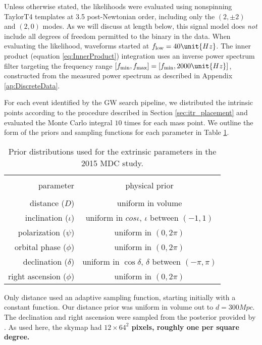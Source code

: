 %
Unless otherwise stated, the likelihoods were evaluated using nonspinning TaylorT4 templates at 3.5 post-Newtonian
order, including only the $(2,\pm 2)$ and $(2,0)$ modes.    As we will discuss at length below, this signal model does \emph{not} include all degrees of
freedom permitted to the binary in the data.  
When evaluating the likelihood,   waveforms started at $f_{\rm low}=40\unit{Hz}$.  The inner product (equation \ref{eq:InnerProduct}) integration uses an inverse power spectrum filter targeting the frequency range $[f_{\rm min},f_{\rm max}]=[f_{\rm min}, 2000\unit{Hz}]$, constructed from the measured power spectrum as described in Appendix \ref{ap:DiscreteData}.  

For each event identified by the GW search pipeline, we distributed the intrinsic points according to the procedure described in Section \ref{sec:itr_placement} and evaluated the Monte Carlo integral $10$ times for each mass point. We outline the form of the priors and sampling functions for each parameter in Table \ref{tbl:priors}.

\begin{table}
\begin{tabular}{r|c}
\hline \\
parameter & physical prior \\
\hline \\
distance ($D$) & uniform in volume \\
inclination ($\iota$) & uniform in $cos\iota$, $\iota$ between $(-1, 1)$ \\
polarization ($\psi$) & uniform in $(0, 2\pi)$ \\
orbital phase ($\phi$) & uniform in $(0, 2\pi)$ \\
declination ($\delta$) & uniform in $\cos\delta$, $\delta$ between $(-\pi, \pi)$ \\
right ascension ($\phi$) & uniform in $(0, 2\pi)$ \\
\hline
\end{tabular}
\caption{\label{tbl:priors}Prior distributions used for the extrinsic parameters in the 2015 MDC study.}
\end{table}

Only distance used an adaptive sampling function, starting initially with a constant function. Our distance prior was uniform in volume out to $d=300\unit{Mpc}$. The declination and right ascension were sampled from the posterior provided by \BS. As used here, the skymap had \textbf{$12\times 64^2$ pixels, roughly one per square degree.}


